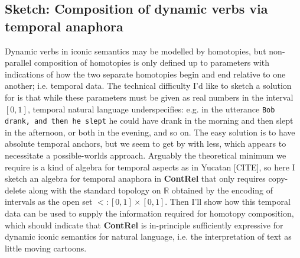 \subsection{Sketch: Composition of dynamic verbs via temporal anaphora}
Dynamic verbs in iconic semantics may be modelled by homotopies, but non-parallel composition of homotopies is only defined up to parameters with indications of how the two separate homotopies begin and end relative to one another; i.e. temporal data. The technical difficulty I'd like to sketch a solution for is that while these parameters must be given as real numbers in the interval $[0,1]$, temporal natural language underspecifies: e.g. in the utterance \texttt{Bob drank, and then he slept} he could have drank in the morning and then slept in the afternoon, or both in the evening, and so on. The easy solution is to have absolute temporal anchors, but we seem to get by with less, which appears to necessitate a possible-worlds approach. Arguably the theoretical minimum we require is a kind of algebra for temporal aspects as in Yucatan [CITE], so here I sketch an algebra for temporal anaphora in \textbf{ContRel} that only requires copy-delete along with the standard topology on $\mathbb{R}$ obtained by the encoding of intervals as the open set $<: [0,1] \times [0,1]$. Then I'll show how this temporal data can be used to supply the information required for homotopy composition, which should indicate that \textbf{ContRel} is in-principle sufficiently expressive for dynamic iconic semantics for natural language, i.e. the interpretation of text as little moving cartoons.

